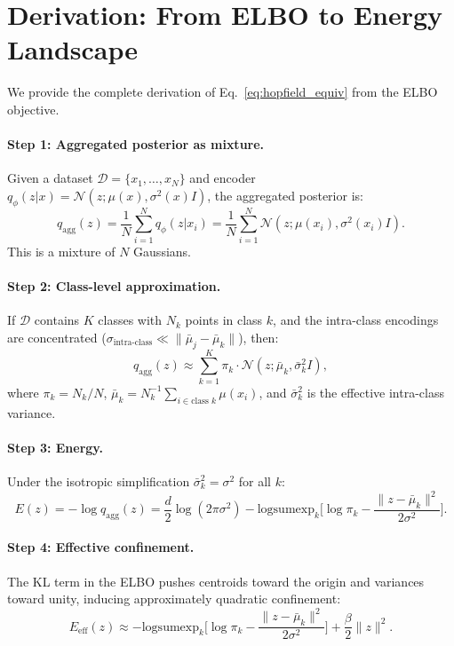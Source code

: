 \documentclass[11pt]{article}
\begin{document}
\section{Derivation: From ELBO to Energy Landscape}
\label{app:derivation}

We provide the complete derivation of Eq.~\ref{eq:hopfield_equiv} from
the ELBO objective.

\paragraph{Step 1: Aggregated posterior as mixture.}
Given a dataset $\mathcal{D} = \{x_1, \ldots, x_N\}$ and encoder
$q_\phi(z|x) = \mathcal{N}(z; \mu(x), \sigma^2(x)I)$, the aggregated
posterior is:
\[
q_{\text{agg}}(z) = \frac{1}{N}\sum_{i=1}^N q_\phi(z|x_i)
  = \frac{1}{N}\sum_{i=1}^N \mathcal{N}(z; \mu(x_i), \sigma^2(x_i)I).
\]
This is a mixture of $N$ Gaussians.

\paragraph{Step 2: Class-level approximation.}
If $\mathcal{D}$ contains $K$ classes with $N_k$ points in class $k$,
and the intra-class encodings are concentrated
($\sigma_{\text{intra-class}} \ll \|\bar{\mu}_j - \bar{\mu}_k\|$), then:
\[
q_{\text{agg}}(z) \approx \sum_{k=1}^K \pi_k \cdot
  \mathcal{N}(z; \bar{\mu}_k, \bar{\sigma}_k^2 I),
\]
where $\pi_k = N_k/N$,
$\bar{\mu}_k = N_k^{-1}\sum_{i \in \text{class } k} \mu(x_i)$,
and $\bar{\sigma}_k^2$ is the effective intra-class variance.

\paragraph{Step 3: Energy.}
Under the isotropic simplification $\bar{\sigma}_k^2 = \sigma^2$ for all $k$:
\[
E(z) = -\log q_{\text{agg}}(z)
  = \frac{d}{2}\log(2\pi\sigma^2)
  - \mathrm{logsumexp}_k\Big[\log\pi_k
    - \frac{\|z - \bar{\mu}_k\|^2}{2\sigma^2}\Big].
\]

\paragraph{Step 4: Effective confinement.}
The KL term in the ELBO pushes centroids toward the origin and variances
toward unity, inducing approximately quadratic confinement:
\[
E_{\text{eff}}(z) \approx
  -\mathrm{logsumexp}_k\Big[\log\pi_k
    - \frac{\|z - \bar{\mu}_k\|^2}{2\sigma^2}\Big]
  + \frac{\beta}{2}\|z\|^2.
\]
\end{document}

